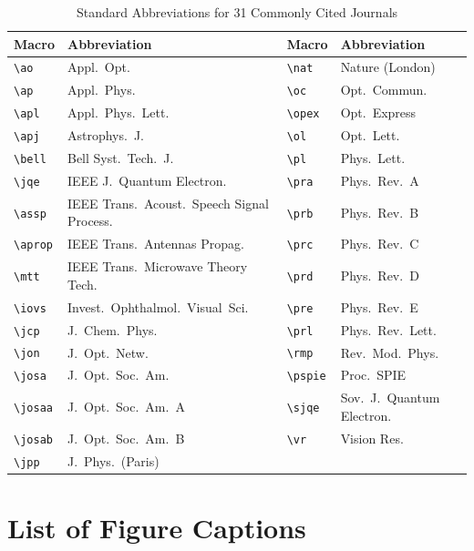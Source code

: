 \documentclass[letterpaper,11pt]{article}   %
\begin{document}
\newpage

\begin{table}[h]
{\bf \caption{Standard Abbreviations for 31 Commonly Cited
Journals}}\begin{center}
\begin{tabular}{lp{2.3in}lp{1.5in}}\hline
Macro & Abbreviation & Macro & Abbreviation \\ \hline
\verb+\ao+ & Appl.\  Opt.\  & \verb+\nat+ & Nature (London)   \\
\verb+\ap+ & Appl.\  Phys.\  & \verb+\oc+ & Opt.\ Commun.\   \\
\verb+\apl+ & Appl.\ Phys.\ Lett.\
  & \verb+\opex+ & Opt.\ Express   \\
\verb+\apj+ & Astrophys.\ J.\  & \verb+\ol+ & Opt.\ Lett.\   \\
\verb+\bell+ & Bell Syst.\ Tech.\ J.\
  & \verb+\pl+ & Phys.\ Lett.\   \\
\verb+\jqe+ & IEEE J.\ Quantum Electron.\
  & \verb+\pra+ & Phys.\ Rev.\ A   \\
\verb+\assp+ & IEEE Trans.\ Acoust.\ Speech Signal Process.\
  & \verb+\prb+ & Phys.\ Rev.\ B   \\
\verb+\aprop+ & IEEE Trans.\  Antennas Propag.\
  & \verb+\prc+ & Phys.\ Rev.\ C   \\
\verb+\mtt+ & IEEE Trans.\ Microwave Theory Tech.\
  & \verb+\prd+ & Phys.\ Rev.\ D   \\
\verb+\iovs+ & Invest.\ Ophthalmol.\ Visual\ Sci.\
  & \verb+\pre+ & Phys.\ Rev.\ E   \\
\verb+\jcp+ & J.\ Chem.\ Phys.\
  & \verb+\prl+ & Phys.\ Rev.\ Lett.\   \\
 \verb+\jon+ & J.\ Opt.\ Netw.\
& \verb+\rmp+ & Rev.\ Mod.\ Phys.\   \\
\verb+\josa+ & J.\ Opt.\ Soc.\ Am.\
& \verb+\pspie+ & Proc.\ SPIE   \\
\verb+\josaa+ & J.\ Opt.\ Soc.\ Am.\ A
  & \verb+\sjqe+ & Sov.\ J.\ Quantum Electron.\   \\
\verb+\josab+ & J.\ Opt.\ Soc.\ Am.\ B
  & \verb+\vr+ & Vision Res.\   \\
\verb+\jpp+ & J.\ Phys.\ (Paris)  & &  \\ \hline
\end{tabular}
\end{center}
\end{table}

\newpage

\section*{List of Figure Captions}
\end{document}
